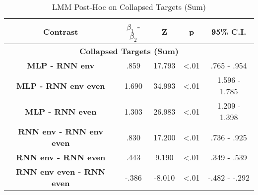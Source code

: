 \begin{table}[h]
\centering
\caption{LMM Post-Hoc on Collapsed Targets (Sum)}
\label{collapsed_post_hoc_33}
\begin{tabular}{ccccc}
\hline
\textbf{Contrast}           & \textbf{$\beta_1$ - $\beta_2$} & \textbf{Z} & \textbf{p} & \textbf{95\% C.I.} \\ \hline
\multicolumn{5}{c}{\textbf{Collapsed Targets (Sum)}}                                                 \\ \hline
\textbf{MLP - RNN env} & .859                & 17.793     & \textless .01   & .765 - .954      \\
\textbf{MLP - RNN env even}          & 1.690                 & 34.993     & \textless .01   & 1.596 - 1.785        \\
\textbf{MLP - RNN even}          & 1.303                 & 26.983     & \textless .01   & 1.209 - 1.398        \\ 
\textbf{RNN env - RNN env even}          & .830                 & 17.200     & \textless .01   & .736 - .925        \\
\textbf{RNN env - RNN even}          & .443                 & 9.190     & \textless .01   & .349 - .539        \\
\textbf{RNN env even - RNN even}          & -.386                 & -8.010     & \textless .01   & -.482 - -.292        \\
\hline
\end{tabular}
\end{table}